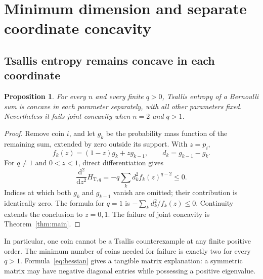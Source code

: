 \documentclass[11pt]{article}
\numberwithin{equation}{section}
\newtheorem{proposition}[theorem]{Proposition}
\theoremstyle{definition}
\theoremstyle{remark}
\begin{document}

\section{Minimum dimension and separate coordinate concavity}\label{bep:sec:mindim}
\subsection{Tsallis entropy remains concave in each coordinate}
\begin{proposition}\label{prop:separate}
For every $n$ and every finite $q>0$, Tsallis entropy of a Bernoulli sum is
concave in each parameter separately, with all other parameters fixed.
Nevertheless it fails joint concavity when $n=2$ and $q>1$.
\end{proposition}
\begin{proof}
Remove coin $i$, and let $g_k$ be the probability mass function of the
remaining sum, extended by zero outside its support. With $z=p_i$,
\[
 f_k(z)=(1-z)g_k+zg_{k-1},\qquad d_k=g_{k-1}-g_k.
\]
For $q\ne1$ and $0<z<1$, direct differentiation gives
\begin{equation}
 \frac{\mathrm d^2}{\mathrm dz^2}H_{\mathrm T,q}
 =-q\sum_k d_k^2 f_k(z)^{q-2}\leq0.\label{eq:separate}
\end{equation}
Indices at which both $g_k$ and $g_{k-1}$ vanish are omitted; their
contribution is identically zero. The formula for $q=1$ is
$-\sum_k d_k^2/f_k(z)\leq0$. Continuity extends the conclusion to $z=0,1$.
The failure of joint concavity is Theorem~\ref{thm:main}.
\end{proof}

In particular, one coin cannot be a Tsallis counterexample at any finite
positive order. The minimum number of coins needed for failure is exactly
two for every $q>1$. Formula~\eqref{eq:hessian} gives a tangible matrix
explanation: a symmetric matrix may have negative diagonal entries while
possessing a positive eigenvalue.
\end{document}

